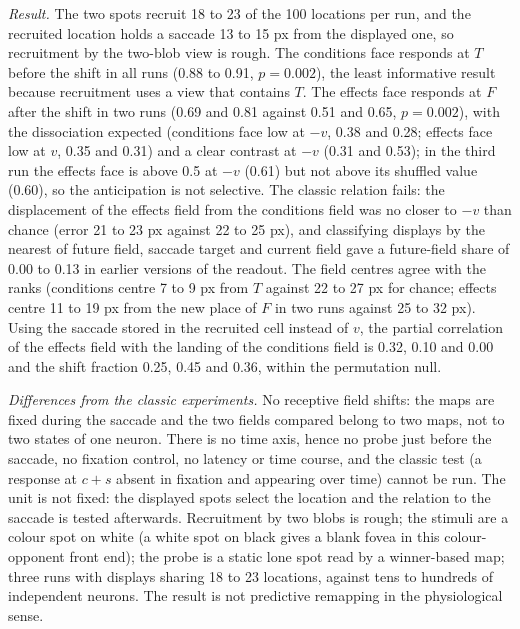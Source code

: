 \documentclass[11pt,a4paper]{article}
\begin{document}
\emph{Result.} The two spots recruit 18 to 23 of the 100 locations per run, and the recruited location holds a saccade 13 to
15 px from the displayed one, so recruitment by the two-blob view is rough. The conditions face responds at $T$ before the shift
in all runs (0.88 to 0.91, $p=0.002$), the least informative result because recruitment uses a view that contains $T$. The
effects face responds at $F$ after the shift in two runs (0.69 and 0.81 against 0.51 and 0.65, $p=0.002$), with the
dissociation expected (conditions face low at $-v$, 0.38 and 0.28; effects face low at $v$, 0.35 and 0.31) and a clear
contrast at $-v$ (0.31 and 0.53); in the third run the effects face is above 0.5 at $-v$ (0.61) but not above its shuffled value
(0.60), so the anticipation is not selective. The classic relation fails: the displacement of the effects field from the
conditions field was no closer to $-v$ than chance (error 21 to 23 px against 22 to 25 px), and classifying displays by
the nearest of future field, saccade target and current field gave a future-field share of 0.00 to 0.13 in earlier versions of
the readout. The field centres agree with the ranks (conditions centre 7 to 9 px from $T$ against 22 to 27 px for chance; effects
centre 11 to 19 px from the new place of $F$ in two runs against 25 to 32 px). Using the saccade stored in the recruited cell
instead of $v$, the partial correlation of the effects field with the landing of the conditions field is 0.32, 0.10 and
0.00 and the shift fraction 0.25, 0.45 and 0.36, within the permutation null.

\emph{Differences from the classic experiments.} No receptive field shifts: the maps are fixed during the saccade and the two
fields compared belong to two maps, not to two states of one neuron. There is no time axis, hence no probe just before the
saccade, no fixation control, no latency or time course, and the classic test (a response at $c+s$ absent in fixation and
appearing over time) cannot be run. The unit is not fixed: the displayed spots select the location and the relation to the saccade
is tested afterwards. Recruitment by two blobs is rough; the stimuli are a colour spot on white (a white spot on black gives a
blank fovea in this colour-opponent front end); the probe is a static lone spot read by a winner-based map; three runs with
displays sharing 18 to 23 locations, against tens to hundreds of independent neurons. The result is not predictive remapping in
the physiological sense.
\end{document}

